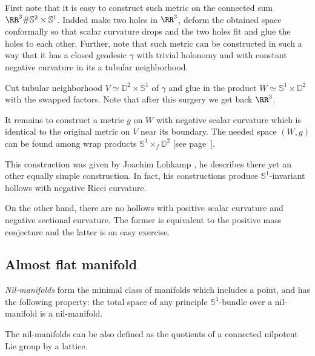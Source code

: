 \medskip

First note that it is easy to construct such metric on the connected sum
$\RR^3\#\mathbb{S}^2\times\mathbb{S}^1$.
Indded make two holes in $\RR^3$, deform the obtained space conformally so that scalar curvature drops and the two holes fit and glue the holes to each other.
Further, note that such metric can be constructed in such a way that it has a closed geodesic $\gamma$ with trivial holonomy and with constant negative curvature in its a tubular neighborhood.

Cut tubular neighborhood $V\simeq\mathbb{D}^2\times \mathbb{S}^1$ of $\gamma$ 
and glue in the product $W\simeq\mathbb{S}^1\times \mathbb{D}^2$ with the swapped factors. 
Note that after this surgery we get back $\RR^3$.

It remains to construct a metric $g$ on $W$ with negative scalar curvature which 
is identical to the original metric on $V$ near its boundary.
The needed space $(W,g)$ can be found among wrap products $\mathbb{S}^1\times_f \mathbb{D}^2$ [see page~\pageref{page:warped product}].
\qeds


This construction was given by Joachim Lohkamp \cite[see][]{lohkamp},
he describes there yet an other equally simple construction.
In fact,
his constructions produce 
$\mathbb{S}^1$-invariant hollows 
with negative Ricci curvature.

On the other hand,
there are no hollows with 
positive scalar curvature and negative sectional curvature.
The former is equivalent to the positive mass conjecture \cite[see][and the references therein]{witten}
and the latter is an easy exercise.












\subsection*{Almost flat manifold\easy}
\label{almost-flat}

\emph{Nil-manifolds} form the minimal class of manifolds which includes a point, and has the following property:  
the total space of any principle $\mathbb{S}^1$-bundle over a nil-manifold is a nil-manifold. 

The nil-manifolds can be also defined as the quotients of a connected nilpotent Lie group by a lattice.

